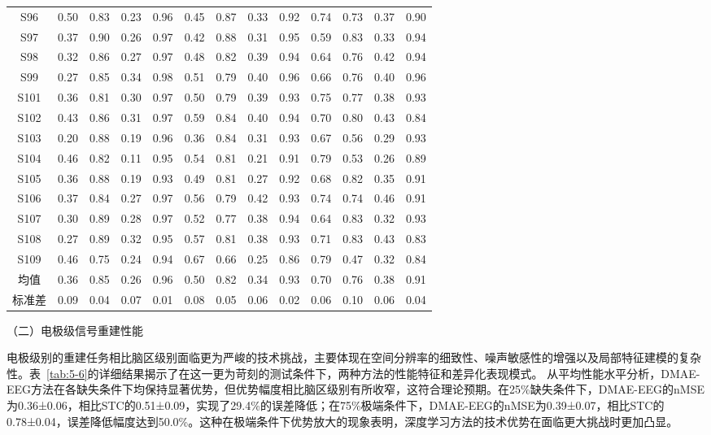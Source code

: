 \begin{table}[ht]
{\begin{tabular}{ccccccccccccc}
S96 & 0.50 & 0.83 & 0.23 & 0.96 & 0.45 & 0.87 & 0.33 & 0.92 & 0.74 & 0.73 & 0.37 & 0.90 \\
S97 & 0.37 & 0.90 & 0.26 & 0.97 & 0.42 & 0.88 & 0.31 & 0.95 & 0.59 & 0.83 & 0.33 & 0.94 \\
S98 & 0.32 & 0.86 & 0.27 & 0.97 & 0.48 & 0.82 & 0.39 & 0.94 & 0.64 & 0.76 & 0.42 & 0.94 \\
S99 & 0.27 & 0.85 & 0.34 & 0.98 & 0.51 & 0.79 & 0.40 & 0.96 & 0.66 & 0.76 & 0.40 & 0.96 \\
S101 & 0.36 & 0.81 & 0.30 & 0.97 & 0.50 & 0.79 & 0.39 & 0.93 & 0.75 & 0.77 & 0.38 & 0.93 \\
S102 & 0.43 & 0.86 & 0.31 & 0.97 & 0.59 & 0.84 & 0.40 & 0.94 & 0.70 & 0.80 & 0.43 & 0.84 \\
S103 & 0.20 & 0.88 & 0.19 & 0.96 & 0.36 & 0.84 & 0.31 & 0.93 & 0.67 & 0.56 & 0.29 & 0.93 \\
S104 & 0.46 & 0.82 & 0.11 & 0.95 & 0.54 & 0.81 & 0.21 & 0.91 & 0.79 & 0.53 & 0.26 & 0.89 \\
S105 & 0.36 & 0.88 & 0.19 & 0.93 & 0.49 & 0.81 & 0.27 & 0.92 & 0.68 & 0.82 & 0.35 & 0.91 \\
S106 & 0.37 & 0.84 & 0.27 & 0.97 & 0.56 & 0.79 & 0.42 & 0.93 & 0.74 & 0.74 & 0.46 & 0.91 \\
S107 & 0.30 & 0.89 & 0.28 & 0.97 & 0.52 & 0.77 & 0.38 & 0.94 & 0.64 & 0.83 & 0.32 & 0.93 \\
S108 & 0.27 & 0.89 & 0.32 & 0.95 & 0.57 & 0.81 & 0.38 & 0.93 & 0.71 & 0.83 & 0.43 & 0.83 \\
S109 & 0.46 & 0.75 & 0.24 & 0.94 & 0.67 & 0.66 & 0.25 & 0.86 & 0.79 & 0.47 & 0.32 & 0.84 \\
\midrule
均值 & 0.36 & 0.85 & 0.26 & 0.96 & 0.50 & 0.82 & 0.34 & 0.93 & 0.70 & 0.76 & 0.38 & 0.91 \\
标准差 & 0.09 & 0.04 & 0.07 & 0.01 & 0.08 & 0.05 & 0.06 & 0.02 & 0.06 & 0.10 & 0.06 & 0.04 \\
\bottomrule
\end{tabular}%
}
\end{table}

（二）电极级信号重建性能

电极级别的重建任务相比脑区级别面临更为严峻的技术挑战，主要体现在空间分辨率的细致性、噪声敏感性的增强以及局部特征建模的复杂性。表~\ref{tab:5-6}的详细结果揭示了在这一更为苛刻的测试条件下，两种方法的性能特征和差异化表现模式。
从平均性能水平分析，DMAE-EEG方法在各缺失条件下均保持显著优势，但优势幅度相比脑区级别有所收窄，这符合理论预期。在25\%缺失条件下，DMAE-EEG的nMSE为0.36±0.06，相比STC的0.51±0.09，实现了29.4\%的误差降低；在75\%极端条件下，DMAE-EEG的nMSE为0.39±0.07，相比STC的0.78±0.04，误差降低幅度达到50.0\%。这种在极端条件下优势放大的现象表明，深度学习方法的技术优势在面临更大挑战时更加凸显。


